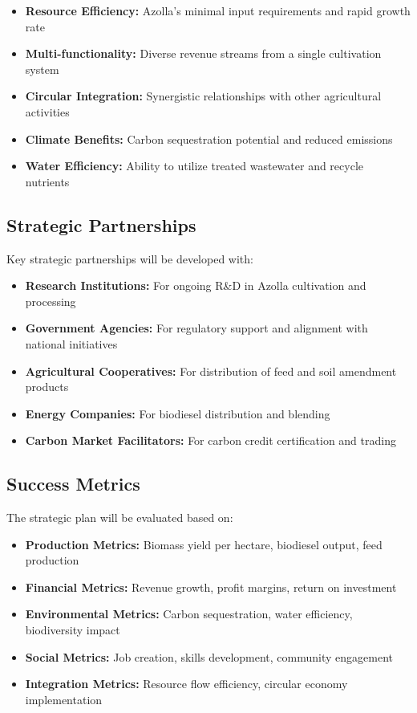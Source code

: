 \begin{itemize}
    \item \textbf{Resource Efficiency:} Azolla's minimal input requirements and rapid growth rate
    \item \textbf{Multi-functionality:} Diverse revenue streams from a single cultivation system
    \item \textbf{Circular Integration:} Synergistic relationships with other agricultural activities
    \item \textbf{Climate Benefits:} Carbon sequestration potential and reduced emissions
    \item \textbf{Water Efficiency:} Ability to utilize treated wastewater and recycle nutrients
\end{itemize}

\subsection{Strategic Partnerships}

Key strategic partnerships will be developed with:

\begin{itemize}
    \item \textbf{Research Institutions:} For ongoing R\&D in Azolla cultivation and processing
    \item \textbf{Government Agencies:} For regulatory support and alignment with national initiatives
    \item \textbf{Agricultural Cooperatives:} For distribution of feed and soil amendment products
    \item \textbf{Energy Companies:} For biodiesel distribution and blending
    \item \textbf{Carbon Market Facilitators:} For carbon credit certification and trading
\end{itemize}

\subsection{Success Metrics}

The strategic plan will be evaluated based on:

\begin{itemize}
    \item \textbf{Production Metrics:} Biomass yield per hectare, biodiesel output, feed production
    \item \textbf{Financial Metrics:} Revenue growth, profit margins, return on investment
    \item \textbf{Environmental Metrics:} Carbon sequestration, water efficiency, biodiversity impact
    \item \textbf{Social Metrics:} Job creation, skills development, community engagement
    \item \textbf{Integration Metrics:} Resource flow efficiency, circular economy implementation
\end{itemize}
